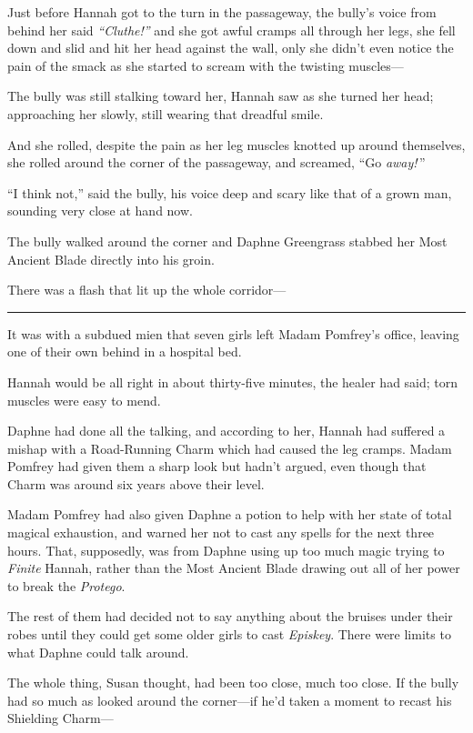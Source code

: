 Just before Hannah got to the turn in the passageway, the bully's voice
from behind her said \emph{``Cluthe!''} and she got awful cramps all
through her legs, she fell down and slid and hit her head against the
wall, only she didn't even notice the pain of the smack as she started
to scream with the twisting muscles---

The bully was still stalking toward her, Hannah saw as she turned her
head; approaching her slowly, still wearing that dreadful smile.

And she rolled, despite the pain as her leg muscles knotted up around
themselves, she rolled around the corner of the passageway, and
screamed, ``Go \emph{away!} ''

``I think not,'' said the bully, his voice deep and scary like that of a
grown man, sounding very close at hand now.

The bully walked around the corner and Daphne Greengrass stabbed her
Most Ancient Blade directly into his groin.

There was a flash that lit up the whole corridor---

\begin{center}\rule{3in}{0.4pt}\end{center}

It was with a subdued mien that seven girls left Madam Pomfrey's office,
leaving one of their own behind in a hospital bed.

Hannah would be all right in about thirty-five minutes, the healer had
said; torn muscles were easy to mend.

Daphne had done all the talking, and according to her, Hannah had
suffered a mishap with a Road-Running Charm which had caused the leg
cramps. Madam Pomfrey had given them a sharp look but hadn't argued,
even though that Charm was around six years above their level.

Madam Pomfrey had also given Daphne a potion to help with her state of
total magical exhaustion, and warned her not to cast any spells for the
next three hours. That, supposedly, was from Daphne using up too much
magic trying to \emph{Finite} Hannah, rather than the Most Ancient Blade
drawing out all of her power to break the \emph{Protego}.

The rest of them had decided not to say anything about the bruises under
their robes until they could get some older girls to cast
\emph{Episkey}. There were limits to what Daphne could talk around.

The whole thing, Susan thought, had been too close, much too close. If
the bully had so much as looked around the corner---if he'd taken a
moment to recast his Shielding Charm---

